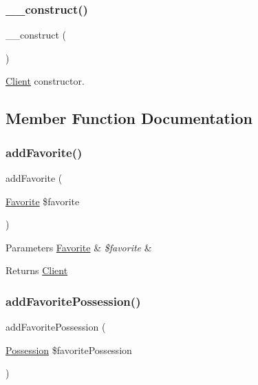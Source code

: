\subsubsection{\texorpdfstring{\_\_construct()}{\_\_construct()}}
{\footnotesize\ttfamily \+\_\+\+\_\+construct (\begin{DoxyParamCaption}{ }\end{DoxyParamCaption})}

\mbox{\hyperlink{class_app_1_1_entity_1_1_client}{Client}} constructor. 

\subsection{Member Function Documentation}
\mbox{\label{class_app_1_1_entity_1_1_client_a615e5ec7b500b8e4ccfb8a2c32d9f8e8}} 
\subsubsection{\texorpdfstring{addFavorite()}{addFavorite()}}
{\footnotesize\ttfamily add\+Favorite (\begin{DoxyParamCaption}\item[{\mbox{\hyperlink{class_app_1_1_entity_1_1_favorite}{Favorite}}}]{\$favorite }\end{DoxyParamCaption})}


\begin{DoxyParams}[1]{Parameters}
\mbox{\hyperlink{class_app_1_1_entity_1_1_favorite}{Favorite}} & {\em \$favorite} & \\
\hline
\end{DoxyParams}
\begin{DoxyReturn}{Returns}
\mbox{\hyperlink{class_app_1_1_entity_1_1_client}{Client}} 
\end{DoxyReturn}
\mbox{\label{class_app_1_1_entity_1_1_client_a6dc717b2e3750bd9862e760f036333cb}} 
\subsubsection{\texorpdfstring{addFavoritePossession()}{addFavoritePossession()}}
{\footnotesize\ttfamily add\+Favorite\+Possession (\begin{DoxyParamCaption}\item[{\mbox{\hyperlink{class_app_1_1_entity_1_1_possession}{Possession}}}]{\$favorite\+Possession }\end{DoxyParamCaption})}


